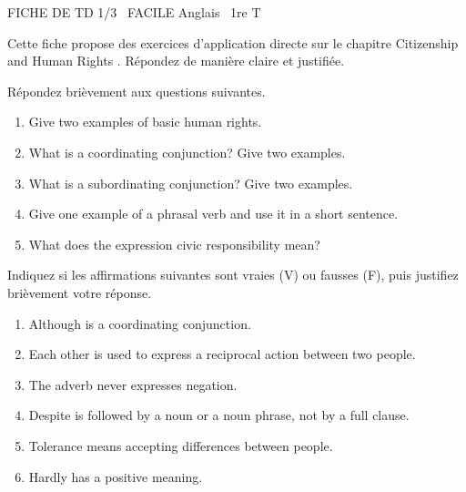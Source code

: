\documentclass[11pt]{article}
\begin{document}
\begin{tcolorbox}[enhanced,colback=popink,colframe=popink,arc=10pt,boxrule=0pt,left=12pt,right=12pt,top=9pt,bottom=9pt]
{\color{white}\popxbold\small FICHE DE TD 1/3 \textbullet\ FACILE \hfill Anglais \textbullet\ 1re T\par}
\end{tcolorbox}
\vspace{4pt}
Cette fiche propose des exercices d'application directe sur le chapitre \og Citizenship and Human Rights \fg{}. Répondez de manière claire et justifiée.

\begin{exercice}
Répondez brièvement aux questions suivantes.
\begin{enumerate}
  \item Give two examples of basic human rights.
  \item What is a coordinating conjunction? Give two examples.
  \item What is a subordinating conjunction? Give two examples.
  \item Give one example of a phrasal verb and use it in a short sentence.
  \item What does the expression \og civic responsibility \fg{} mean?
\end{enumerate}
\end{exercice}

\begin{exercice}
Indiquez si les affirmations suivantes sont vraies (V) ou fausses (F), puis justifiez brièvement votre réponse.
\begin{enumerate}
  \item \og Although \fg{} is a coordinating conjunction.
  \item \og Each other \fg{} is used to express a reciprocal action between two people.
  \item The adverb \og never \fg{} expresses negation.
  \item \og Despite \fg{} is followed by a noun or a noun phrase, not by a full clause.
  \item Tolerance means accepting differences between people.
  \item \og Hardly \fg{} has a positive meaning.
\end{enumerate}
\end{exercice}
\end{document}
